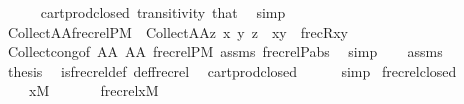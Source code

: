 \begin{isabellebody}
\ \ \ \ \isamarkupfalse%
\ cartprod{\isacharunderscore}{\kern0pt}closed\ transitivity\ that\ \isamarkupfalse%
\ simp\isanewline
\ \ \isamarkupfalse%
\isanewline
\ \ \isamarkupfalse%
\ {\isachardoublequoteopen}Collect{\isacharparenleft}{\kern0pt}A{\isasymtimes}A{\isacharcomma}{\kern0pt}frecrelP{\isacharparenleft}{\kern0pt}{\isacharhash}{\kern0pt}{\isacharhash}{\kern0pt}M{\isacharparenright}{\kern0pt}{\isacharparenright}{\kern0pt}\ {\isacharequal}{\kern0pt}\ Collect{\isacharparenleft}{\kern0pt}A{\isasymtimes}A{\isacharcomma}{\kern0pt}{\isasymlambda}z{\isachardot}{\kern0pt}\ {\isacharparenleft}{\kern0pt}{\isasymexists}x\ y{\isachardot}{\kern0pt}\ z\ {\isacharequal}{\kern0pt}\ {\isasymlangle}x{\isacharcomma}{\kern0pt}y{\isasymrangle}\ {\isasymand}\ frecR{\isacharparenleft}{\kern0pt}x{\isacharcomma}{\kern0pt}y{\isacharparenright}{\kern0pt}{\isacharparenright}{\kern0pt}{\isacharparenright}{\kern0pt}{\isachardoublequoteclose}\isanewline
\ \ \ \ \isamarkupfalse%
\ Collect{\isacharunderscore}{\kern0pt}cong{\isacharbrackleft}{\kern0pt}of\ {\isachardoublequoteopen}A{\isasymtimes}A{\isachardoublequoteclose}\ {\isachardoublequoteopen}A{\isasymtimes}A{\isachardoublequoteclose}\ {\isachardoublequoteopen}frecrelP{\isacharparenleft}{\kern0pt}{\isacharhash}{\kern0pt}{\isacharhash}{\kern0pt}M{\isacharparenright}{\kern0pt}{\isachardoublequoteclose}{\isacharbrackright}{\kern0pt}\ assms\ frecrelP{\isacharunderscore}{\kern0pt}abs\ \isamarkupfalse%
\ simp\isanewline
\ \ \isamarkupfalse%
\ assms\isanewline
\ \ \isamarkupfalse%
\ {\isacharquery}{\kern0pt}thesis\ \isamarkupfalse%
\ is{\isacharunderscore}{\kern0pt}frecrel{\isacharunderscore}{\kern0pt}def\ def{\isacharunderscore}{\kern0pt}frecrel\ \isamarkupfalse%
\ cartprod{\isacharunderscore}{\kern0pt}closed\isanewline
\ \ \ \ \isamarkupfalse%
\ simp\isanewline
{}\isamarkupfalse%
%
\endisatagproof
{\isafoldproof}%
%
\isadelimproof
\isanewline
%
\endisadelimproof
\isanewline
{}\isamarkupfalse%
\ frecrel{\isacharunderscore}{\kern0pt}closed{\isacharcolon}{\kern0pt}\isanewline
\ \ \isanewline
\ \ \ \ {\isachardoublequoteopen}x{\isasymin}M{\isachardoublequoteclose}\isanewline
\ \ \isanewline
\ \ \ \ {\isachardoublequoteopen}frecrel{\isacharparenleft}{\kern0pt}x{\isacharparenright}{\kern0pt}{\isasymin}M{\isachardoublequoteclose}\isanewline
%
\isadelimproof
%
\endisadelimproof
%
\isatagproof

\end{isabellebody}
